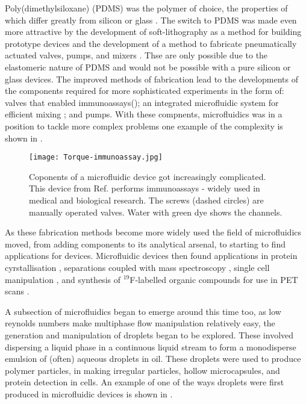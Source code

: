 Poly(dimethylsiloxane) (PDMS) was the polymer of choice, the properties of which differ greatly
from silicon or glass \citep{ng2002components,whitesides2001flexible}. The switch to PDMS was made even
more attractive by the development of soft-lithography as a method for building prototype
devices \citep{mcdonald2000fabrication} and the development of a method to fabricate pneumatically actuated valves,
pumps, and mixers \citep{mcdonald2000fabrication}. Thse are only possible due to the elastomeric nature of PDMS
and would not be possible with a pure silicon or glass devices.
The improved methods of fabrication lead to the developments of the components required for more sophisticated
experiments in the form of: valves that enabled immunoassays()\citep{weibel2005torque}; an integrated
microfluidic system for efficient mixing \citep{gunther2005micromixing}; and pumps\citep{laser2004review}.
With these compnents, microfluidics was in a position to tackle more complex problems one example of the complexity is shown in .


\begin{figure}
  \begin{center}
  \texttt{[image: Torque-immunoassay.jpg]}
  \end{center}
  \caption{Coponents of a microfluidic device got increasingly complicated. This device from Ref.\citep{weibel2005torque} performs
  immunoassays - widely used in medical and biological research. The screws (dashed circles) are manually operated valves. Water with green dye
  shows the channels.}
  \label{fig:immunoassay}
\end{figure}


As these fabrication methods become more widely used the field of microfluidics moved, from
adding components to its analytical arsenal, to starting to find applications for devices.
Microfluidic devices then found applications in protein cyrstallisation \citep{hansen2002robust},
separations coupled with mass spectroscopy \citep{ramsey1997generating}, single cell manipulation \citep{wheeler2003microfluidic},
and synthesis of $^{19}$F-labelled organic compounds for use in PET scans \citep{lee2005multistep}.

A subsection of microfluidics began to emerge around this time too, as
low reynolds numbers make multiphase flow manipulation
relatively easy, the generation and manipulation of droplets\citep{thorsen2001dynamic, link2004geometrically, tan2004design} began to be explored.
These involved dispersing a liquid phase in a continuous
liquid stream to form a monodisperse emulsion of (often) aqueous droplets in oil. These droplets
were used to produce polymer particles\citep{nie2005polymer}, in making irregular particles\citep{nisisako2007formation},
hollow microcapsules\citep{utada2005monodisperse}, and protein detection in cells\citep{huebner2007quantitative}. An example of one of the ways droplets were first
produced in microfluidic devices is shown in .

